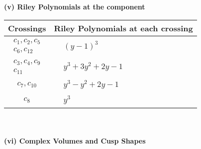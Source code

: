 \documentclass[1p]{elsarticle_modified}
\theoremstyle{definition}
\begin{document}
\newpage\renewcommand{\arraystretch}{1}
\flushleft \textbf{(v) Riley Polynomials at the component}\newline \\
\begin{tabular}{m{50pt}|m{274pt}}
Crossings & \hspace{64pt}Riley Polynomials at each crossing \\
\hline $$\begin{aligned}c_{1},c_{2},c_{5}\\c_{6},c_{12}\end{aligned}$$&$\begin{aligned}
&(y-1)^3
\end{aligned}$\\
\hline $$\begin{aligned}c_{3},c_{4},c_{9}\\c_{11}\end{aligned}$$&$\begin{aligned}
&y^3+3 y^2+2 y-1
\end{aligned}$\\
\hline $$\begin{aligned}c_{7},c_{10}\end{aligned}$$&$\begin{aligned}
&y^3- y^2+2 y-1
\end{aligned}$\\
\hline $$\begin{aligned}c_{8}\end{aligned}$$&$\begin{aligned}
&y^3
\end{aligned}$\\
\hline
\end{tabular}\\~\\
\newpage\flushleft \textbf{(vi) Complex Volumes and Cusp Shapes}
\end{document}

